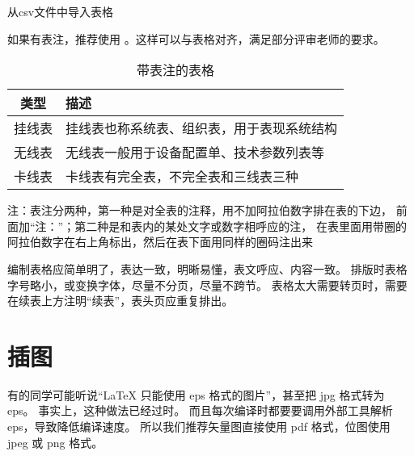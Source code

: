 \begin{table}
	\centering
	\caption{从csv文件中导入表格}
	\begin{adjustbox}{max width=\linewidth}
	\end{adjustbox}
	\label{tab:asterid}
\end{table}

如果有表注，推荐使用 。这样可以与表格对齐，满足部分评审老师的要求。

\begin{table}
  \centering
  \begin{threeparttable}
    \caption{带表注的表格}
    \label{tab:tablewithnotes}
    \begin{tabular}{cl}
      \toprule
      类型   & 描述                                       \\
      \midrule
      挂线表 & 挂线表也称系统表、组织表，用于表现系统结构 \\
      无线表 & 无线表一般用于设备配置单、技术参数列表等   \\
      卡线表 & 卡线表有完全表，不完全表和三线表三种       \\
      \bottomrule
    \end{tabular}
    \begin{tablenotes}[flushleft]
      \item 注：表注分两种，第一种是对全表的注释，用不加阿拉伯数字排在表的下边，
      前面加“注：”；第二种是和表内的某处文字或数字相呼应的注，
      在表里面用带圈的阿拉伯数字在右上角标出，然后在表下面用同样的圈码注出来
    \end{tablenotes}
  \end{threeparttable}
\end{table}

编制表格应简单明了，表达一致，明晰易懂，表文呼应、内容一致。
排版时表格字号略小，或变换字体，尽量不分页，尽量不跨节。
表格太大需要转页时，需要在续表上方注明“续表”，表头页应重复排出。



\section{插图}

有的同学可能听说“\LaTeX{} 只能使用 eps 格式的图片”，甚至把 jpg 格式转为 eps。
事实上，这种做法已经过时。
而且每次编译时都要要调用外部工具解析 eps，导致降低编译速度。
所以我们推荐矢量图直接使用 pdf 格式，位图使用 jpeg 或 png 格式。

